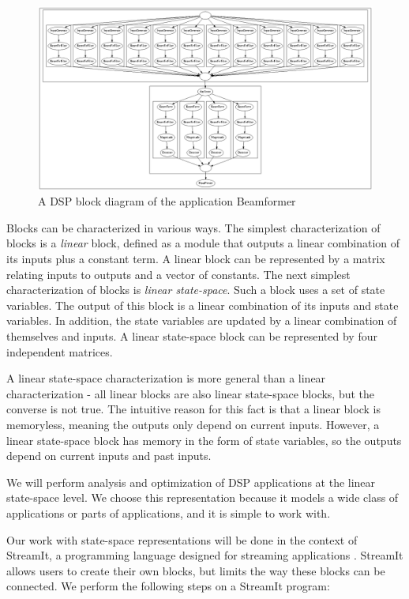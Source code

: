 \begin{figure}[bthp]
  \centering
  \includegraphics[width=6.0in]{figures/beamformer.eps}
  \caption{A DSP block diagram of the application Beamformer}
  \label{fig:block-diagram}
\end{figure}

    Blocks can be characterized in various ways. The simplest characterization
of blocks is a \textit{linear} block, defined as a module that
outputs a linear combination of its inputs plus a constant term. A
linear block can be represented by a matrix relating inputs to
outputs and a vector of constants. The next simplest
characterization of blocks is \textit{linear state-space}. Such a
block uses a set of state variables. The output of this block is a
linear combination of its inputs and state variables. In addition,
the state variables are updated by a linear combination of
themselves and inputs.  A linear state-space block can be
represented by four independent matrices.

    A linear state-space characterization is more general than a
linear characterization - all linear blocks are also linear
state-space blocks, but the converse is not true. The intuitive
reason for this fact is that a linear block is memoryless, meaning
the outputs only depend on current inputs. However, a linear
state-space block has memory in the form of state variables, so
the outputs depend on current inputs and past inputs.

    We will perform analysis and optimization of DSP applications at
the linear state-space level. We choose this representation
because it models a wide class of applications or parts of
applications, and it is simple to work with.

    Our work with state-space representations will be done in the
context of StreamIt, a programming language designed for streaming
applications \cite{streamitcc}.  StreamIt allows users to create
their own blocks, but limits the way these blocks can be
connected. We perform the following steps on a StreamIt program:

